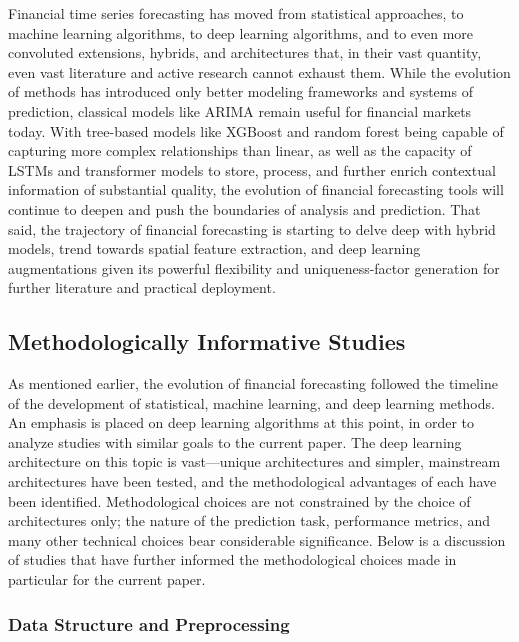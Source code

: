 \documentclass[stu,floatsintext]{apa7}
\begin{document}
Financial time series forecasting has moved from statistical approaches, to machine learning algorithms, to deep learning algorithms, and to even more convoluted extensions, hybrids, and architectures that, in their vast quantity, even vast literature and active research cannot exhaust them. While the evolution of methods has introduced only better modeling frameworks and systems of prediction, classical models like ARIMA remain useful for financial markets today. With tree-based models like XGBoost and random forest being capable of capturing more complex relationships than linear, as well as the capacity of LSTMs and transformer models to store, process, and further enrich contextual information of substantial quality, the evolution of financial forecasting tools will continue to deepen and push the boundaries of analysis and prediction. That said, the trajectory of financial forecasting is starting to delve deep with hybrid models, trend towards spatial feature extraction, and deep learning augmentations given its powerful flexibility and uniqueness-factor generation for further literature and practical deployment.

\subsection{Methodologically Informative Studies}

As mentioned earlier, the evolution of financial forecasting followed the timeline of the development of statistical, machine learning, and deep learning methods. An emphasis is placed on deep learning algorithms at this point, in order to analyze studies with similar goals to the current paper. The deep learning architecture on this topic is vast—unique architectures and simpler, mainstream architectures have been tested, and the methodological advantages of each have been identified. Methodological choices are not constrained by the choice of architectures only; the nature of the prediction task, performance metrics, and many other technical choices bear considerable significance. Below is a discussion of studies that have further informed the methodological choices made in particular for the current paper.

\subsubsection{Data Structure and Preprocessing}
\end{document}
